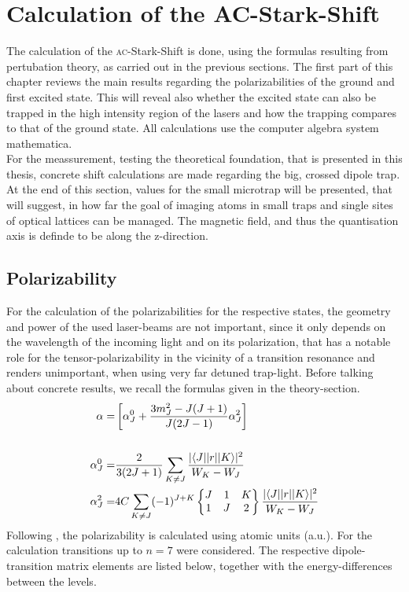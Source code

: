 \chapter{Calculation of the AC-Stark-Shift}

The calculation of the \textsc{ac}-Stark-Shift is done, using the formulas resulting from pertubation theory, as carried out in the previous sections. The first part of this chapter reviews the main results regarding the polarizabilities of the ground and first excited state. This will reveal also whether the excited state can also be trapped in the high intensity region of the lasers and how the trapping compares to that of the ground state. All calculations use the computer algebra system mathematica.\\For the meassurement, testing the theoretical foundation, that is presented in this thesis, concrete shift calculations are made regarding the big, crossed dipole trap. At the end of this section, values for the small microtrap will be presented, that will suggest, in how far the goal of imaging atoms in small traps and single sites of optical lattices can be managed. The magnetic field, and thus the quantisation axis is definde to be along the z-direction.

\section{Polarizability}
For the calculation of the polarizabilities for the respective states, the geometry and power of the used laser-beams are not important, since it only depends on the wavelength of the incoming light and on its polarization, that has a notable role for the tensor-polarizability in the vicinity of a transition resonance and renders unimportant, when using very far detuned trap-light. Before talking about concrete results, we recall the formulas given in the theory-section. 
\begin{align}
\alpha=&\left[\alpha^0_J+\frac{3m^2_J-J(J+1)}{J(2J-1)}\alpha^2_J\right]\\
\notag\\
\alpha^0_J=&\frac{2}{3(2J+1)}\sum_{K\neq J}\frac{|\langle J| |r| | K\rangle|^2}{W_K-W_J}\notag\\
\alpha^2_J=&4C\sum_{K\neq J}(-1)^{J+K}\begin{Bmatrix}J&1&K\\1&J&2\end{Bmatrix}\frac{|\langle J| |r| | K\rangle|^2}{W_K-W_J}\notag
\end{align}
Following \cite{magic01}, the polarizability is calculated using atomic units (a.u.). For the calculation transitions up to $n=7$ were considered. The respective dipole-transition matrix elements are listed below, together with the energy-differences between the levels.

